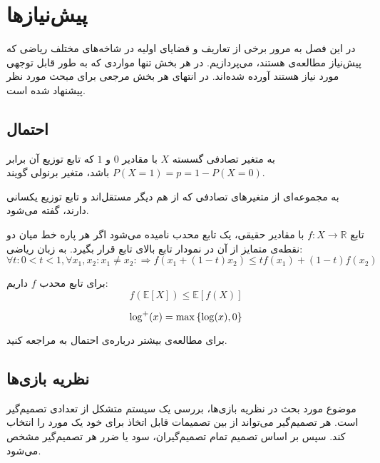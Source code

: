 \chapter{پیش‌نیازها}
\label{chapter:preliminaries}
در این فصل به مرور برخی از تعاریف و قضایای اولیه در شاخه‌های مختلف ریاضی که پیش‌نیاز مطالعه‌ی \picod هستند، می‌پردازیم. در هر بخش تنها مواردی که به طور قابل توجهی‌ مورد نیاز هستند آورده شده‌اند. در انتهای هر بخش مرجعی برای مبحث مورد نظر پیشنهاد شده است.
\section{احتمال}
\begin{definition}
	به متغیر تصادفی گسسته
	$X$
	با مقادیر
	$0$
	و
	$1$
	که تابع توزیع آن برابر
	$P(X = 1) = p = 1 - P(X = 0)$
	باشد، متغیر برنولی گویند.
\end{definition}
\begin{definition}
به مجموعه‌ای از متغیرهای تصادفی که از هم دیگر مستقل‌‌اند و تابع توزیع یکسانی دارند، گفته می‌شود.
\end{definition}
\begin{definition}
	تابع
	$f: X \rightarrow \mathbb{R}$
	با مقادیر حقیقی، یک تابع محدب نامیده می‌شود اگر هر پاره خط میان دو نقطه‌ی متمایز از آن در نمودار تابع بالای تابع قرار بگیرد. به زبان ریاضی:
	$$\forall t: 0 < t < 1, \forall x_1, x_2: x_1 \ne x_2: \Rightarrow f(x_1 + (1 - t) x_2) \leq tf(x_1) + (1 - t) f(x_2)$$
\end{definition}
\begin{theorem}
	\label{Jensen}
	برای تابع محدب
	$f$
	داریم:
	$$f(\mathbb{E}[X]) \leq \mathbb{E}[f(X)]$$
\end{theorem}
\begin{notation}[$\log^{+}$]
	$$\log^{+}(x) = \max\left\{ \log(x), 0 \right\}$$
\end{notation}
برای مطالعه‌ی بیشتر درباره‌ی احتمال به
\cite{book:pro}
مراجعه کنید.
\section{نظریه بازی‌ها}
موضوع مورد بحث در نظریه بازی‌ها، بررسی یک سیستم متشکل از تعدادی تصمیم‌گیر است. هر تصمیم‌گیر می‌تواند از بین تصمیمات قابل اتخاذ برای خود یک مورد را انتخاب کند. سپس بر اساس تصمیم تمام تصمیم‌گیران، سود یا ضرر هر تصمیم‌گیر مشخص می‌شود.

